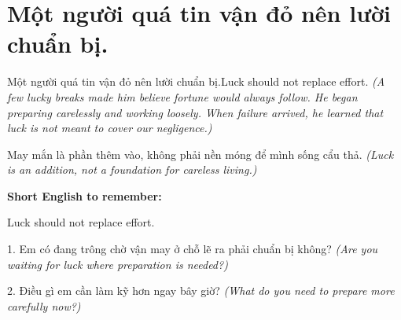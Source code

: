 \section{Một người quá tin vận đỏ nên lười chuẩn bị.}
\begin{truyen}{Một người quá tin vận đỏ nên lười chuẩn bị.}{Luck should not replace effort.}
\textit{(A few lucky breaks made him believe fortune would always follow. He began preparing carelessly and working loosely. When failure arrived, he learned that luck is not meant to cover our negligence.)}
\end{truyen}
\begin{baihoc}
May mắn là phần thêm vào, không phải nền móng để mình sống cẩu thả.
\textit{(Luck is an addition, not a foundation for careless living.)}
\end{baihoc}
\begin{ghinhoanh}
\textbf{Short English to remember:}

Luck should not replace effort.
\end{ghinhoanh}
\begin{tuhocnhanh}
1. Em có đang trông chờ vận may ở chỗ lẽ ra phải chuẩn bị không? \textit{(Are you waiting for luck where preparation is needed?)}

2. Điều gì em cần làm kỹ hơn ngay bây giờ? \textit{(What do you need to prepare more carefully now?)}
\end{tuhocnhanh}
\ngancach

